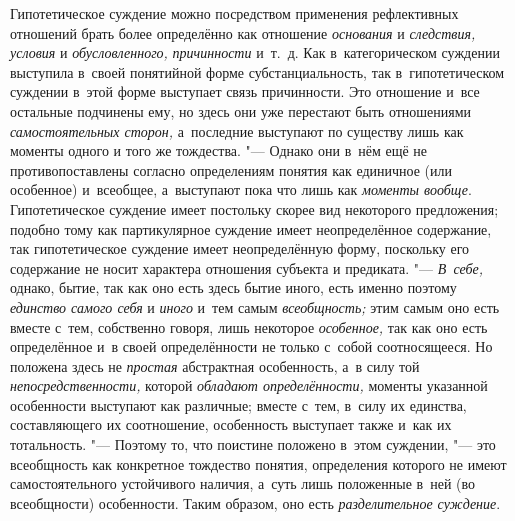 Гипотетическое суждение можно посредством применения
рефлективных отношений брать более определённо как отношение
{\em основания} и {\em следствия, условия} и {\em обусловленного,}
{\em причинности} и~т.~д.
Как в~категорическом суждении выступила в~своей понятийной форме
субстанциальность, так в~гипотетическом суждении в~этой форме выступает
связь причинности. Это отношение и~все остальные подчинены ему, но здесь
они уже перестают быть отношениями
{\em самостоятельных сторон,}
а~последние выступают по существу лишь как моменты одного и
того же тождества. "--- Однако они в~нём ещё не
противопоставлены согласно определениям понятия как единичное (или
особенное) и~всеобщее, а~выступают пока что лишь как
{\em моменты вообще}.
Гипотетическое суждение имеет постольку скорее вид некоторого
предложения; подобно тому как партикулярное суждение имеет неопределённое
содержание, так гипотетическое суждение имеет неопределённую форму,
поскольку его содержание не носит характера отношения субъекта и
предиката. "--- {\em В~себе,}
однако, бытие, так как оно есть здесь бытие иного, есть
именно поэтому {\em единство самого
себя} и {\em иного}
и~тем самым
{\em всеобщность;} этим
самым оно есть вместе с~тем, собственно говоря, лишь некоторое
{\em особенное,} так как
оно есть определённое и~в своей определённости не только с~собой
соотносящееся. Но положена здесь не
{\em простая} абстрактная
особенность, а~в силу той
{\em непосредственности,}
которой {\em обладают
определённости,} моменты указанной особенности выступают как
различные; вместе с~тем, в~силу их единства, составляющего их соотношение,
особенность выступает также и~как их тотальность. "---
Поэтому то, что поистине положено в~этом суждении, "---
это всеобщность как конкретное тождество понятия,
определения которого не имеют самостоятельного устойчивого наличия, а~суть
лишь положенные в~ней (во всеобщности) особенности. Таким образом, оно есть
{\em разделительное суждение}.


